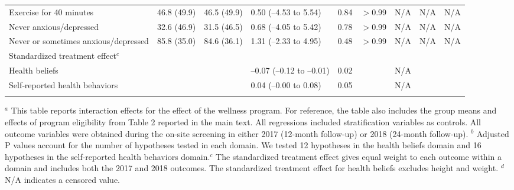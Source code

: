 \documentclass{article}
\begin{document}
\begin{landscape}
\begin{table}[tbp]
{\begin{tabularx}{\linewidth}{lCClCClCC}
\hspace{1em} Exercise for 40 minutes&46.8  (49.9)&46.5  (49.9)&0.50 (--4.53 to 5.54)&0.84&$>$0.99&N/A &N/A&N/A \tabularnewline
\hspace{1em} Never anxious/depressed&32.6  (46.9)&31.5  (46.5)&0.68 (--4.05 to 5.42)&0.78&$>$0.99&N/A &N/A&N/A \tabularnewline
\hspace{1em} Never or sometimes anxious/depressed&85.8  (35.0)&84.6  (36.1)&1.31 (--2.33 to 4.95)&0.48&$>$0.99&N/A &N/A&N/A \tabularnewline
Standardized treatment effect$^{c}$&&&&&&&& \tabularnewline
\hspace{1em} Health beliefs&&&--0.07 (--0.12 to --0.01)&0.02&&N/A && \tabularnewline
\hspace{1em} Self‐reported health behaviors&&&0.04 (--0.00 to 0.08)&0.05&&N/A && \tabularnewline
\bottomrule \addlinespace[\belowrulesep]

\end{tabularx}
\begin{flushleft}
\tiny $^{a}$ This table reports interaction effects for the effect of the wellness program. For reference, the table also includes the group means and effects of program eligibility from Table 2 reported in the main text. All regressions included stratification variables as controls. All outcome variables were obtained during the on-site screening in either 2017 (12-month follow-up) or 2018 (24-month follow-up). \newline $^{b}$ Adjusted P values account for the number of hypotheses tested in each domain. We tested 12 hypotheses in the health beliefs domain and 16 hypotheses in the self-reported health behaviors domain.\newline $^{c}$ The standardized treatment effect gives equal weight to each outcome within a domain and includes both the 2017 and 2018 outcomes. The standardized treatment effect for health beliefs excludes height and weight. \newline $^{d}$ N/A indicates a censored value.
\end{flushleft}
}
\end{table}
\end{landscape}
\end{document}
